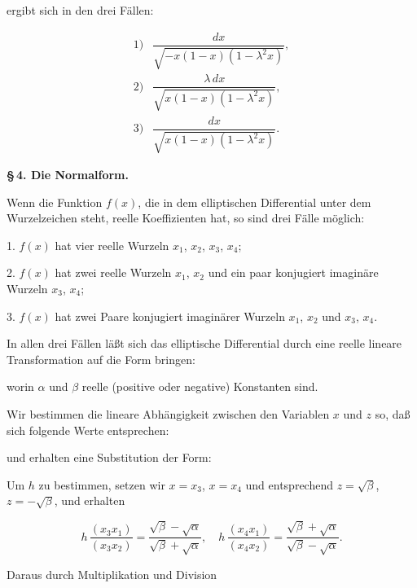 
ergibt sich in den drei Fällen:

\[
\begin{array}{ll}
1) & \dfrac{dx}{\sqrt{-x(1-x)(1-\lambda^2x)}}, \\[10pt]
2) & \dfrac{\lambda\,dx}{\sqrt{x(1-x)(1-\lambda^2x)}}, \\[10pt]
3) & \dfrac{dx}{\sqrt{x(1-x)(1-\lambda^2x)}}.
\end{array}
\]

\begin{center}
\textbf{\S\,4. Die  Normalform.}
\end{center}

Wenn die Funktion $f(x)$, die in dem elliptischen Differential unter dem Wurzelzeichen steht, reelle Koeffizienten hat, so sind drei Fälle möglich:

1. $f(x)$ hat vier reelle Wurzeln $x_1$, $x_2$, $x_3$, $x_4$;

2. $f(x)$ hat zwei reelle Wurzeln $x_1$, $x_2$ und ein paar konjugiert imaginäre Wurzeln $x_3$, $x_4$;

3. $f(x)$ hat zwei Paare konjugiert imaginärer Wurzeln $x_1$, $x_2$ und $x_3$, $x_4$.

In allen drei Fällen läßt sich das elliptische Differential durch eine reelle lineare Transformation auf die Form bringen:


worin $\alpha$ und $\beta$ reelle (positive oder negative) Konstanten sind.

Wir bestimmen die lineare Abhängigkeit zwischen den Variablen $x$ und $z$ so, daß sich folgende Werte entsprechen:


und erhalten eine Substitution der Form:


Um $h$ zu bestimmen, setzen wir $x = x_3$, $x = x_4$ und entsprechend $z = \sqrt{\beta}$, $z = -\sqrt{\beta}$, und erhalten

\[
h\,\dfrac{(x_3x_1)}{(x_3x_2)} = \dfrac{\sqrt{\beta}-\sqrt{\alpha}}{\sqrt{\beta}+\sqrt{\alpha}}, \quad h\,\dfrac{(x_4x_1)}{(x_4x_2)} = \dfrac{\sqrt{\beta}+\sqrt{\alpha}}{\sqrt{\beta}-\sqrt{\alpha}}.
\]

Daraus durch Multiplikation und Division

